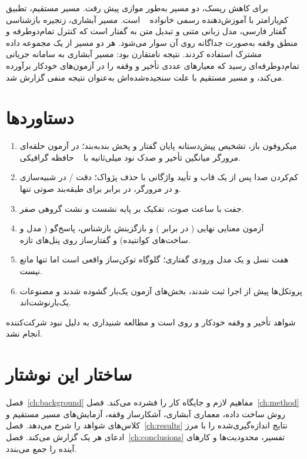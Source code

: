 برای کاهش ریسک، دو مسیر به‌طور موازی پیش رفت. مسیر مستقیم، تطبیق
کم‌پارامتر  با آموزش‌دهنده رسمی خانواده
~\cite{moshifinetune2024} است. مسیر آبشاری، زنجیره بازشناسی
گفتار فارسی، مدل زبانی متنی و تبدیل متن به گفتار است که کنترل تمام‌دوطرفه
و منطق وقفه به‌صورت جداگانه روی آن سوار می‌شود. هر دو مسیر از یک مجموعه
داده مشترک استفاده کردند. نتیجه نامتقارن بود: مسیر آبشاری به سامانه جریانی
تمام‌دوطرفه‌ای رسید که معیارهای عددی تأخیر و وقفه را در آزمون‌های خودکار
برآورده می‌کند، و مسیر مستقیم با علت سنجیده‌شده‌اش به‌عنوان نتیجه منفی گزارش
شد.

\section{دستاوردها}
\label{sec:contributions}

\begin{enumerate}
\item {} میکروفون باز، تشخیص
      پیش‌دستانه پایان گفتار و پخش بند‌به‌بند؛ در آزمون حلقه‌ای مرورگر میانگین
      تأخیر  و صدک نود  میلی‌ثانیه با ~ حافظه
      گرافیکی.

\item {} کم‌کردن صدا پس از یک قاب و تأیید واژگانی با
      حذف پژواک؛ دقت /  در شبیه‌سازی و  در
      مرورگر، در برابر  برای طبقه‌بند صوتی تنها.

\item {}  جفت با  ساعت صوت،
      تفکیک بر پایه نشست و نشت گروهی صفر.

\item {} آزمون معنایی نهایی ( در برابر
      ) و بازگزینش بازشناس، پاسخ‌گو ( مدل و ساخت‌های کوانتیده) و
      گفتارساز روی پنل‌های تازه.

\item {} هفت نسل  و یک مدل
      ورودی گفتاری؛ گلوگاه توکن‌ساز واقعی است اما تنها مانع نیست.

\item {} پروتکل‌ها پیش از اجرا ثبت شدند، بخش‌های
      آزمون یک‌بار گشوده شدند و مصنوعات یک‌بار‌نوشت‌اند.
\end{enumerate}

شواهد تأخیر و وقفه خودکار و روی  است و مطالعه شنیداری به دلیل نبود
شرکت‌کننده انجام نشد.

\section{ساختار این نوشتار}

فصل~\ref{ch:background} مفاهیم لازم و جایگاه کار را فشرده می‌کند.
فصل~\ref{ch:method} روش ساخت داده، معماری آبشاری، آشکارساز وقفه، آزمایش‌های
مسیر مستقیم و کلاس‌های شواهد را شرح می‌دهد. فصل~\ref{ch:results} نتایج
اندازه‌گیری‌شده را با مرز ادعای هر یک گزارش می‌کند.
فصل~\ref{ch:conclusions} تفسیر، محدودیت‌ها و کارهای آینده را جمع می‌بندد.
